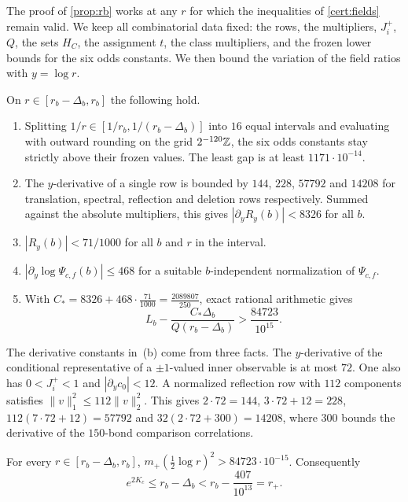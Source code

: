 The proof of \cref{prop:rb} works at any $r$ for which the inequalities of \cref{cert:fields} remain valid. We keep all combinatorial data fixed: the rows, the multipliers, $J_i^+$, $Q$, the sets $H_C$, the assignment $t$, the class multipliers, and the frozen lower bounds for the six odds constants. We then bound the variation of the field ratios with $y=\log r$.

\begin{certificate}[Interval]\label{cert:interval}
On $r\in[r_b-\Delta_b,r_b]$ the following hold.
\begin{enumerate}[label=\textup{(\alph*)}]
\item Splitting $1/r\in[1/r_b,1/(r_b-\Delta_b)]$ into $16$ equal intervals and evaluating with outward rounding on the grid $2^{-120}\mathbb Z$, the six odds constants stay strictly above their frozen values. The least gap is at least $1171\cdot10^{-14}$.
\item The $y$-derivative of a single row is bounded by $144$, $228$, $57792$ and $14208$ for translation, spectral, reflection and deletion rows respectively. Summed against the absolute multipliers, this gives $|\partial_yR_y(b)|<8326$ for all $b$.
\item $|R_y(b)|<71/1000$ for all $b$ and $r$ in the interval.
\item $|\partial_y\log\Psi_{c,f}(b)|\le468$ for a suitable $b$-independent normalization of $\Psi_{c,f}$.
\item With $C_*=8326+468\cdot\frac{71}{1000}=\frac{2089807}{250}$, exact rational arithmetic gives
\[
 L_b-\frac{C_*\Delta_b}{Q(r_b-\Delta_b)}>\frac{84723}{10^{15}} .
\]
\end{enumerate}
\end{certificate}

The derivative constants in~(b) come from three facts. The $y$-derivative of the conditional representative of a $\pm1$-valued inner observable is at most $72$. One also has $0<J_i^+<1$ and $|\partial_yc_0|<12$. A normalized reflection row with $112$ components satisfies $\|v\|_1^2\le112\|v\|_2^2$. This gives $2\cdot72=144$, $3\cdot72+12=228$, $112(7\cdot72+12)=57792$ and $32(2\cdot72+300)=14208$, where $300$ bounds the derivative of the $150$-bond comparison correlations.

\begin{theorem}\label{thm:upper}
For every $r\in[r_b-\Delta_b,r_b]$, $m_+(\tfrac12\log r)^2>84723\cdot10^{-15}$. Consequently
\[
 e^{2K_c}\le r_b-\Delta_b<r_b-\frac{407}{10^{13}}=r_+ .
\]
\end{theorem}


